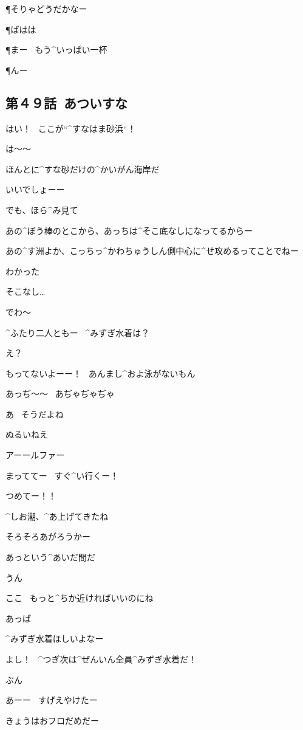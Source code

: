 \page
\P そりゃどうだかなー

\P ばはは

\P まー
\ もう^{いっぱい}{一杯}

\P んー


\subsection{第４９話\ あついすな}

\page[78]
\A はい！
\ ここが“^{すなはま}{砂浜}“！

\T は〜〜

\T ほんとに^{すな}{砂}だけの^{かいがん}{海岸}だ

\A いいでしょーー

\page
\A でも、ほら^{み}{見}て

\A あの^{ぼう}{棒}のとこから、あっちは^{そこ}{底}なしになってるからー

\A あの^{す}{洲}よか、こっちっ^{かわちゅうしん}{側中心}に^{せ}{攻}めるってことでねー

\T わかった

\M そこなし…

\page
\M でわ〜

\page
\A ^{ふたり}{二人}ともー
\ ^{みずぎ}{水着}は？

\T え？

\T もってないよーー！
\ あんまし^{およ}{泳}がないもん

\T あっぢ〜〜
\ あぢゃぢゃぢゃ

\A あ
\ そうだよね

\page
\M ぬるいねえ

\T アーールファー

\A まっててー
\ すぐ^{い}{行}くー！

\page[84]
\T つめてー！！

\A ^{しお}{潮}、^{あ}{上}げてきたね

\A そろそろあがろうかー

\page
\T あっという^{あいだ}{間}だ

\A うん

\M ここ
\ もっと^{ちか}{近}ければいいのにね

\T あっぱ

\T ^{みずぎ}{水着}ほしいよなー

\A よし！
\ ^{つぎ}{次}は^{ぜんいん}{全員}^{みずぎ}{水着}だ！

\A ぶん

\page
\T あーー
\ すげえやけたー

\M きょうはおフロだめだー

